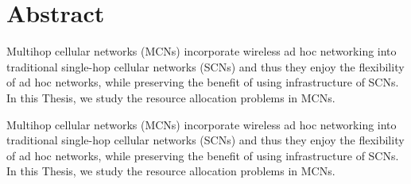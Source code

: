 \chapter*{Abstract}
\begingroup
\raggedright
{} %
\setlength{\parskip}{0.5\baselineskip}

Multihop cellular networks (MCNs) incorporate wireless ad hoc networking into traditional single-hop cellular networks (SCNs) and thus they enjoy the flexibility of ad hoc networks, while preserving the benefit of using infrastructure of SCNs. In this Thesis, we study the resource allocation problems in MCNs.

Multihop cellular networks (MCNs) incorporate wireless ad hoc networking into traditional single-hop cellular networks (SCNs) and thus they enjoy the flexibility of ad hoc networks, while preserving the benefit of using infrastructure of SCNs. In this Thesis, we study the resource allocation problems in MCNs.

\endgroup